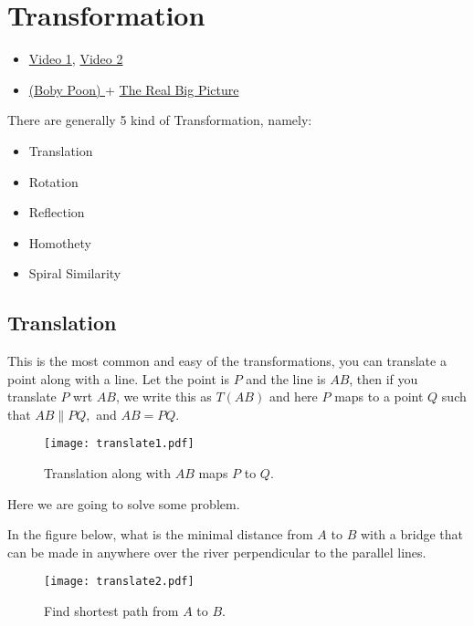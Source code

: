\chapter{Transformation}%

\begin{linkb}
   \begin{itemize}
        \item  \href{https://www.youtube.com/watch?v=yohxAxqnCt8}{Video 1}, \href{https://www.youtube.com/watch?v=7tAmJ8cvmYM}{Video 2}
        \item \href{https://drive.google.com/file/d/1_XBfSBLO3NSWAKw9_mkhYPIWgkRfwm2Z/view}{(Boby Poon) } + \href{https://drive.google.com/file/d/11kMt5af6pfZDoaV932MsEf6Sx0vvznsk/view}{The Real Big Picture}
   \end{itemize}
\end{linkb}


There are generally  5 kind of Transformation, namely:
\begin{itemize}
	\item Translation
	\item Rotation
	\item Reflection
	\item Homothety
	\item Spiral Similarity		
\end{itemize}

\section{Translation}
This is the most common  and easy of the transformations, you can translate a point along with a line. Let the point is $P$ and the line is $AB$, then if you translate $P$ wrt $AB$, we write this as $T(AB)$ and here $P$ maps to a point $Q$ such that $AB \parallel PQ, $ and $AB=PQ$.

\begin{figure}[ht]
\centering
	\texttt{[image: translate1.pdf]}
	\caption{Translation along with $AB$ maps $P$ to $Q$.}
\end{figure}

Here we are going to solve some problem.
\begin{example}
In the figure below, what is the minimal distance from $A$ to $B$ with a bridge that can be made in anywhere over the river perpendicular to the parallel lines.
\end{example}

\begin{figure}[ht]
\centering
		\texttt{[image: translate2.pdf]}
	\caption{Find shortest path from $A$ to $B$.}
\end{figure}

